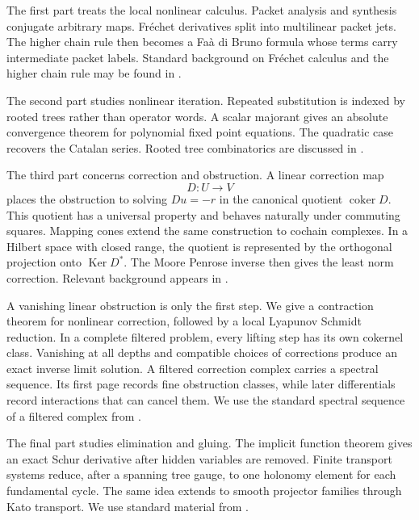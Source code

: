 \documentclass{aomart}
\theoremstyle{definition}
\theoremstyle{remark}
\newcommand{\Ker}{\operatorname{Ker}}
\newcommand{\coker}{\operatorname{coker}}
\begin{document}
The first part treats the local nonlinear calculus.  Packet analysis and synthesis conjugate arbitrary maps.  Fr\'echet derivatives split into multilinear packet jets.  The higher chain rule then becomes a Fa\`a di Bruno formula whose terms carry intermediate packet labels.  Standard background on Fr\'echet calculus and the higher chain rule may be found in \cite{AbrahamMarsdenRatiu1988,ConstantineSavits1996,Deimling1985}.

The second part studies nonlinear iteration.  Repeated substitution is indexed by rooted trees rather than operator words.  A scalar majorant gives an absolute convergence theorem for polynomial fixed point equations.  The quadratic case recovers the Catalan series.  Rooted tree combinatorics are discussed in \cite{Stanley2012,LodayVallette2012,HairerLubichWanner2006}.

The third part concerns correction and obstruction.  A linear correction map
\[
D:U\longrightarrow V
\]
places the obstruction to solving $Du=-r$ in the canonical quotient $\coker D$.  This quotient has a universal property and behaves naturally under commuting squares.  Mapping cones extend the same construction to cochain complexes.  In a Hilbert space with closed range, the quotient is represented by the orthogonal projection onto $\Ker D^*$.  The Moore Penrose inverse then gives the least norm correction.  Relevant background appears in \cite{Weibel1994,Penrose1955}.

A vanishing linear obstruction is only the first step.  We give a contraction theorem for nonlinear correction, followed by a local Lyapunov Schmidt reduction.  In a complete filtered problem, every lifting step has its own cokernel class.  Vanishing at all depths and compatible choices of corrections produce an exact inverse limit solution.  A filtered correction complex carries a spectral sequence.  Its first page records fine obstruction classes, while later differentials record interactions that can cancel them.  We use the standard spectral sequence of a filtered complex from \cite{Weibel1994,McCleary2001}.

The final part studies elimination and gluing.  The implicit function theorem gives an exact Schur derivative after hidden variables are removed.  Finite transport systems reduce, after a spanning tree gauge, to one holonomy element for each fundamental cycle.  The same idea extends to smooth projector families through Kato transport.  We use standard material from \cite{Deimling1985,GrossTucker1987,Kato1950,Kato1995,KobayashiNomizu1963}.
\end{document}
